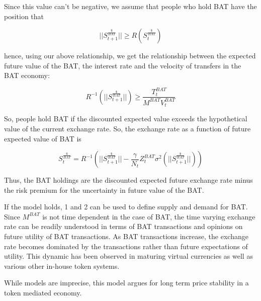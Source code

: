 \documentclass[11pt]{article}
\begin{document}
Since this value can't be negative, we assume that people who hold BAT
have the position that

\[ ||S^{\frac{\$}{BAT}}_{t+1}|| \geq R( S^{\frac{\$}{BAT}}_{t})\]

hence, using our above relationship, we get the relationship between the expected future value of the BAT, the interest rate and the velocity of transfers in the BAT economy:

\[R^{-1} (||S^{\frac{\$}{BAT}}_{t+1}||) \geq \frac{T^{BAT}_{t}}{M^{BAT} V^{BAT}_{t}} \]

So, people hold BAT if the discounted expected value exceeds the
hypothetical value of the current exchange rate. So, the exchange rate
as a function of future expected value of BAT is

\[\tag{2} S^{\frac{\$}{BAT}}_{t} = R^{-1} (||S^{\frac{\$}{BAT}}_{t+1}|| -\frac{\gamma}{N_t}Z^{BAT}_{t} \sigma^{2}(||S^{\frac{\$}{BAT}}_{t+1} ||) )\]
    
Thus, the BAT holdings are the discounted expected future exchange
rate minus the risk premium for the uncertainty in future value of the
BAT.

If the model holds, {1} and {2} can be used to define supply and
demand for BAT. Since $M^{BAT}$ is not time dependent in the case of BAT, the
time varying exchange rate can be readily understood in terms of BAT
transactions and opinions on future utility of BAT transactions. As
BAT transactions increase, the exchange rate becomes dominated by the
transactions rather than future expectations of utility. This dynamic
has been observed in maturing virtual currencies as well as various
other in-house token systems.

While models are imprecise, this model argues for long term price
stability in a token mediated economy. 

\printbibliography
\end{document}
